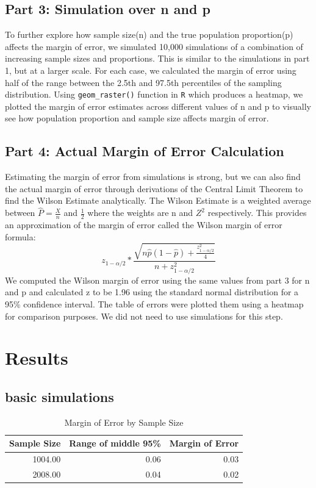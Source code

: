 \documentclass{article}\usepackage[]{graphicx}\usepackage[]{xcolor}
\begin{document}
\begin{multicols}{2}
\subsection{Part 3: Simulation over n and p}

To further explore how sample size(n) and the true population proportion(p) affects the margin of error, we simulated 10,000 simulations of a combination of increasing sample sizes and proportions. This is similar to the simulations in part 1, but at a larger scale. For each case, we calculated the margin of error using half of the range between the 2.5th and 97.5th percentiles of the sampling distribution. Using \texttt{geom\_raster()} function in \texttt{R} which produces a heatmap, we plotted the margin of error estimates across different values of n and p to visually see how population proportion and sample size affects margin of error.

\subsection{Part 4: Actual Margin of Error Calculation}

Estimating the margin of error from simulations is strong, but we can also find the actual margin of error through derivations of the Central Limit Theorem to find the Wilson Estimate analytically. The Wilson Estimate is a weighted average between \(\hat{P} = \frac{X}{n}\) and \(\frac{1}{2}\) where the weights are n and \(Z^2\) respectively. This provides an approximation of the margin of error called the Wilson margin of error formula:
$$
z_{1 - \alpha/2} * \frac{ \sqrt{n \hat{p} (1 - \hat{p}) + \frac{z_{1 - \alpha/2}^2}{4}} }{n + z_{1 - \alpha/2}^2}
$$
We computed the Wilson margin of error using the same values from part 3 for n and p and calculated z to be 1.96 using the standard normal distribution for a 95\% confidence interval. The table of errors were plotted them using a heatmap for comparison purposes. We did not need to use simulations for this step.



\section{Results}

\subsection{basic simulations}
\begin{table}[H]
\centering
\begingroup\small
\begin{tabular}{rrr}
  \hline
Sample Size & Range of middle 95\% & Margin of Error \\ 
  \hline
1004.00 & 0.06 & 0.03 \\ 
  2008.00 & 0.04 & 0.02 \\ 
   \hline
\end{tabular}
\endgroup
\caption{Margin of Error by Sample Size} 
\label{Table 1}
\end{table}



\end{multicols}
\end{document}
